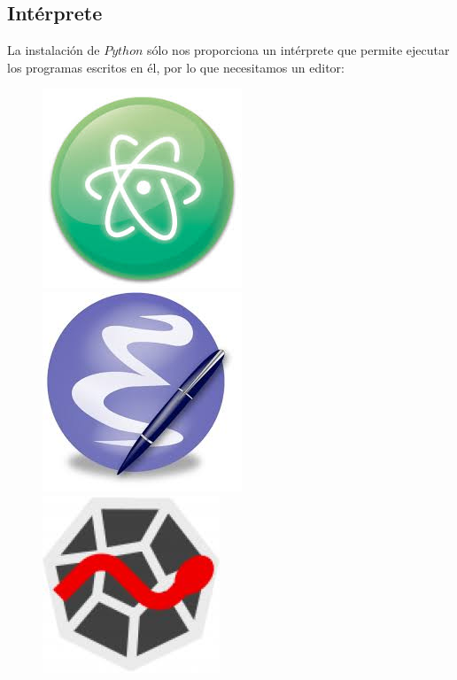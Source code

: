 \documentclass{beamer}
\begin{document}
\subsection{Intérprete}
\begin{frame}
La instalación de $Python$ sólo nos proporciona un intérprete que permite ejecutar los programas escritos en él, por lo que necesitamos un editor:\\
\pause 
\begin{figure}
\includegraphics[scale=0.3]{atom.jpg}
\includegraphics[scale=0.4]{emacs.jpg}
\includegraphics[scale=0.3]{spider.jpg}
\end{figure}
\end{frame}
\end{document}

